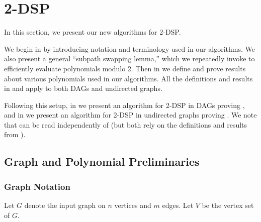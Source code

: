\documentclass[11pt]{article}
\newcommand{\grp}[1]{\left(#1\right)}
\theoremstyle{definition}
\begin{document}




\section{2-DSP}
\label{sec:2dsp}

In this section, we present our new algorithms for \textsf{2-DSP}.

We begin in  by introducing notation and terminology used in our algorithms.
We also present a general ``subpath swapping lemma,'' which we repeatedly invoke to efficiently evaluate polynomials modulo 2.
Then in  we define and prove results about various  polynomials used in our algorithms.
All the definitions and results in  and  apply to both DAGs and undirected graphs.

Following this setup, in  we present an algorithm for \textsf{2-DSP} in DAGs proving , and in  we present an algorithm for \textsf{2-DSP} in undirected graphs proving .
We note that
 can be read independently of  (but both 
rely on the definitions and results from ).

\subsection{Graph and Polynomial Preliminaries}
\label{subsec:alg-prelim}

\subsubsection*{Graph Notation}
Let $G$ denote the input graph on $n$ vertices and $m$ edges.
Let $V$ be the vertex set of $G$.
\end{document}
